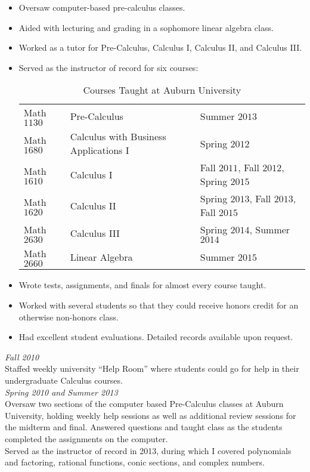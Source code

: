 \documentclass{article}
\begin{document}
\begin{itemize}[noitemsep]
\item Oversaw computer-based pre-calculus classes.
\item Aided with lecturing and grading in a sophomore
  linear algebra class.  
\item Worked as a tutor for Pre-Calculus, Calculus I, Calculus II, and
  Calculus III.  
\item Served as the instructor of record for six courses:
\begin{table}[H]
\begin{center}
\begin{tabular}{lll}
Math $1130$ & Pre-Calculus & Summer $2013$ \\
Math $1680$ & Calculus with Business Applications I & Spring $2012$ \\
Math $1610$ & Calculus I & Fall $2011$, Fall $2012$, Spring $2015$ \\
Math $1620$ & Calculus II & Spring $2013$, Fall $2013$, Fall $2015$ \\
Math $2630$ & Calculus III & Spring $2014$, Summer $2014$ \\
Math $2660$ & Linear Algebra & Summer $2015$ \\
[-1pc]
\end{tabular}
\end{center}
\caption{Courses Taught at Auburn University}%
\end{table}
\item Wrote tests, assignments, and finals for almost every course taught.
\item Worked with several students so that they could receive honors credit for
  an otherwise non-honors class.
\item Had excellent student evaluations. Detailed records available upon
  request.
\end{itemize}

 \hfill {\it Fall 2010\/} \\
Staffed weekly university ``Help Room'' where students could go for help in
their undergraduate Calculus courses. \\ 

 \hfill {\it Spring 2010 and Summer 2013} \\
Oversaw two sections of the computer based Pre-Calculus classes at Auburn
University, holding weekly help sessions as well as additional review sessions
for the midterm and final.  Answered questions and taught class as the
students completed the assignments on the computer. \\
Served as the instructor of record in 2013, during which I covered polynomials
and factoring, rational functions, conic sections, and complex numbers.
\\
\end{document}
